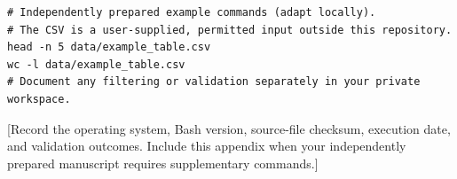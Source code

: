 \documentclass[12pt,letterpaper]{article}
\begin{document}
\begin{singlespace}
\begin{lstlisting}
# Independently prepared example commands (adapt locally).
# The CSV is a user-supplied, permitted input outside this repository.
head -n 5 data/example_table.csv
wc -l data/example_table.csv
# Document any filtering or validation separately in your private workspace.
\end{lstlisting}
\end{singlespace}

[Record the operating system, Bash version, source-file checksum, execution
date, and validation outcomes. Include this appendix when your independently prepared manuscript
requires supplementary commands.]
\end{document}
